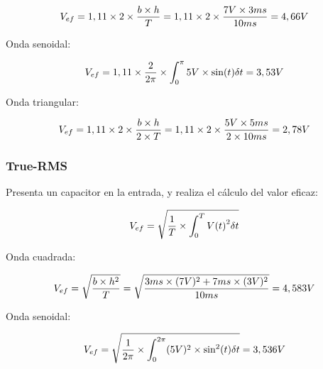 \documentclass{article}
\begin{document}
\begin{center}
\begin{equation}
V_{ef} = 1,11 \times 2 \times {b \times h \over T} = 1,11 \times 2 \times {7V \times 3ms \over 10ms} = 4,66V
\end{equation}
\end{center}
\medskip


Onda senoidal:

\begin{center}
\begin{equation}
V_{ef} = 1,11 \times {2 \over 2\pi} \times \int_{0}^{\pi} 5V \times \sin (t)\delta t = 3,53 V
\end{equation}
\end{center}
\medskip

Onda triangular:

\begin{center}
\begin{equation}
V_{ef} = 1,11 \times 2 \times {b \times h \over 2 \times T} = 1,11 \times 2 \times {5V \times 
5ms \over 2 \times 10ms} = 2,78V
\end{equation}
\end{center}
\bigskip

\subsubsection{True-RMS}

Presenta un capacitor en la entrada, y realiza el cálculo del valor eficaz:
\begin{center}
\begin{equation}
V_{ef} = \sqrt{ {{1}\over{T}} \times \int_{0}^{T} {V(t)}^2 \delta t}
\end{equation}
\end{center}
\medskip

Onda cuadrada:

\begin{center}
\begin{equation}
V_{ef} = \sqrt{b \times h^2 \over T} = \sqrt{3ms \times (7V)^2 + 7ms \times (3V)^2 \over 10ms} = 4,583V
\end{equation}
\end{center}
\medskip

Onda senoidal:

\begin{center}
\begin{equation}
V_{ef} = \sqrt{{1 \over 2\pi} \times \int_{0}^{2\pi} (5V)^2 \times \sin ^2 (t)\delta t} = 3,536 V
\end{equation}
\end{center}
\medskip
\end{document}
